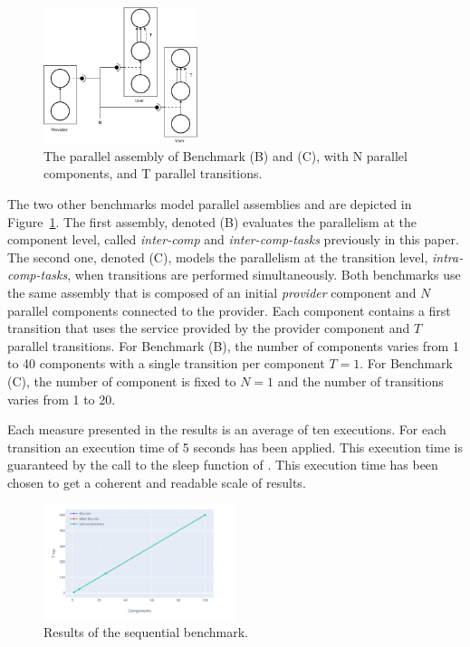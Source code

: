 \begin{figure}[h]
  \begin{center}
    \includegraphics[width=0.4\textwidth]{./images/par.pdf}
    \caption{The \mad parallel assembly of Benchmark (B) and (C), with N parallel components, and T parallel transitions.}
    \label{fig:par}
  \end{center}
\end{figure}

The two other benchmarks model \mad parallel assemblies and are
depicted in Figure~\ref{fig:par}. The first assembly, denoted (B)
evaluates the parallelism at the component level, called
\emph{inter-comp} and \emph{inter-comp-tasks} previously in this
paper. The second one, denoted (C), models the parallelism at the
transition level, \ie \emph{intra-comp-tasks}, when transitions are
performed simultaneously.
%
Both benchmarks use the same assembly that is composed of an initial
\emph{provider} component and $N$ parallel components connected to the
provider. Each component contains a first transition that uses the
service provided by the provider component and $T$ parallel
transitions. For Benchmark (B), the number of components varies from 1
to 40 components with a single transition per component $T=1$. For
Benchmark (C), the number of component is fixed to $N=1$ and the
number of transitions varies from 1 to 20.

Each measure presented in the results is an average of ten executions.
For each transition an execution time of 5 seconds has been
applied. This execution time is guaranteed by the call to the sleep
function of \python. This execution time has been chosen to get a
coherent and readable scale of results.

\begin{figure}[h]
  \begin{center} 
    \includegraphics[width=0.5\textwidth]{./images/evaluations_sequential.pdf}
    \caption{Results of the sequential benchmark.}
    \label{fig:seqres}
  \end{center}
\end{figure}


